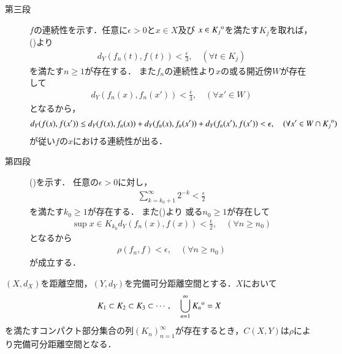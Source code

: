 \begin{prf}
\begin{description}
			\item[第三段]
				$f$の連続性を示す．任意に$\epsilon > 0$と$x \in X$及び
				$x \in {\kern0ptK_j}^{\mathrm{o}}$を満たす$K_j$を取れば，
				()より
				\begin{align}
					d_Y(f_n(t),f(t)) < \frac{\epsilon}{3},
					\quad (\forall t \in K_j)
				\end{align}
				を満たす$n \geq 1$が存在する．
				また$f_n$の連続性より$x$の或る開近傍$W$が存在して
				\begin{align}
					d_Y(f_n(x),f_n(x')) < \frac{\epsilon}{3},
					\quad (\forall x' \in W)
				\end{align}
				となるから，
				\begin{align}
					d_Y(f(x),f(x'))
					\leq d_Y(f(x),f_n(x)) + d_Y(f_n(x),f_n(x')) + d_Y(f_n(x'),f(x'))
					< \epsilon,
					\quad (\forall x' \in W \cap {\kern0ptK_j}^{\mathrm{o}})
				\end{align}
				が従い$f$の$x$における連続性が出る．
			
			\item[第四段]
				()を示す．
				任意の$\epsilon > 0$に対し，
				\begin{align}
					\sum_{k=k_0+1}^\infty 2^{-k} < \frac{\epsilon}{2}
				\end{align}
				を満たす$k_0 \geq 1$が存在する．
				また()より
				或る$n_0 \geq 1$が存在して
				\begin{align}
					\sup{x \in K_{k_0}}{d_Y(f_n(x),f(x))} < \frac{\epsilon}{2},
					\quad (\forall n \geq n_0)
				\end{align}
				となるから
				\begin{align}
					\rho(f_n,f) < \epsilon, \quad (\forall n \geq n_0)
				\end{align}
				が成立する．
				\QED
		\end{description}
	\end{prf}
	
	\begin{screen}
		\begin{thm}[$C(X,Y)$の完備可分性]
			$(X,d_X)$を距離空間，$(Y,d_Y)$を完備可分距離空間とする．$X$において
			\begin{align}
				K_1 \subset K_2 \subset K_3 \subset \cdots,
				\quad \bigcup_{n=1}^\infty {\kern0ptK_n}^{\mathrm{o}} = X
				\label{eq:completeness_and_separability_of_space_of_continuous_functions_2}
			\end{align}
			を満たすコンパクト部分集合の列$(K_n)_{n=1}^\infty$が存在するとき，$C(X,Y)$は$\rho$により完備可分距離空間となる．
		\end{thm}
	\end{screen}